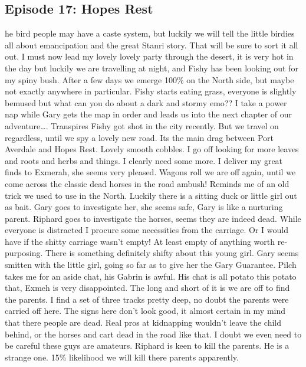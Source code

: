 \subsection{Episode 17: Hopes Rest}
he bird people may have a caste system, but luckily we will tell the little birdies all about emancipation and the great Stanri story. That will be sure to sort it all out.\medskip
I must now lead my lovely lovely party through the desert, it is very hot in the day but luckily we are travelling at night, and Fishy has been looking out for my spiny bush.\medskip
After a few days we emerge 100\% on the North side, but maybe not exactly anywhere in particular.\medskip
Fishy starts eating grass, everyone is slightly bemused but what can you do about a dark and stormy emo??\medskip
I take a power nap while Gary gets the map in order and leads us into the next chapter of our adventure….\medskip
Transpires Fishy got shot in the city recently. But we travel on regardless, until we spy a lovely new road. Its the main drag between Port Averdale and Hopes Rest. Lovely smooth cobbles. I go off looking for more leaves and roots and herbs and things. I clearly need some more. I deliver my great finds to Exmerah, she seems very pleased.\medskip
Wagons roll we are off again, until we come across the classic dead horses in the road ambush! Reminds me of an old trick we used to use in the North.\medskip
Luckily there is a sitting duck or little girl out as bait. Gary goes to investigate her, she seems safe, Gary is like a nurturing parent.\medskip
Riphard goes to investigate the horses, seems they are indeed dead.\medskip
While everyone is distracted I procure some necessities from the carriage. Or I would have if the shitty carriage wasn’t empty! At least empty of anything worth re-purposing.\medskip
There is something definitely shifty about this young girl. Gary seems smitten with the little girl, going so far as to give her the Gary Guarantee.\medskip
Pilch takes me for an aside chat, his Gabrin is awful. His chat is all potato this potato that, Exmeh is very disappointed. The long and short of it is we are off to find the parents.\medskip
I find a set of three tracks pretty deep, no doubt the parents were carried off here. The signs here don’t look good, it almost certain in my mind that there people are dead. Real pros at kidnapping wouldn’t leave the child behind, or the horses and cart dead in the road like that. I doubt we even need to be careful these guys are amateurs.\medskip
Riphard is keen to kill the parents. He is a strange one. 15\% likelihood we will kill there parents apparently.\medskip
